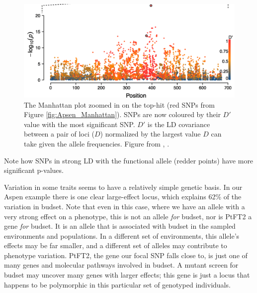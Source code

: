 \begin{figure}
\begin{center}
\includegraphics[width=\textwidth]{Journal_figs/Quant_gen/Wang_GWAS_poplar/Wang_Fig_zoomed_Manhattan.pdf}
\end{center}
\caption{The Manhattan plot zoomed in on the top-hit (red SNPs from Figure
  \ref{fig:Apsen_Manhattan}). SNPs are now coloured by their $D\prime$
  value with the most significant SNP. $D\prime$ is the LD
  covariance between a pair of loci ($D$) normalized by
  the largest value $D$ can take given the allele frequencies. Figure from \citet{wang:18},  \PLOSccBY. } \label{fig:Apsen_zoom_Manhattan}
\end{figure}
Note how SNPs in strong LD with the functional allele (redder
points) have more significant p-values. 

Variation in some traits seems to have a relatively simple genetic
basis. In our Aspen example there is one clear large-effect locus,
which explains  62\% of the variation in budset. Note that even in this case, where we have an allele with a very strong effect on a phenotype, this is not an allele {\it for} budset, nor is PtFT2 a gene {\it for} budset.  It is an allele that is associated with budset in the sampled environments and populations. In a different set of environments, this allele's effects may be far smaller, and a different set of alleles may contribute to phenotype variation. PtFT2, the gene our focal SNP falls close to, is just one of many genes and molecular pathways involved in budset. A mutant screen for budset may uncover many genes with larger effects; this gene is just a locus that happens to be polymorphic in this particular set of genotyped individuals. 

